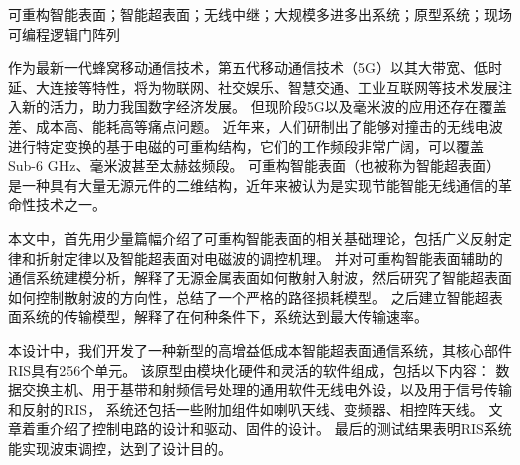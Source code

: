 \documentclass[supercite]{HustGraduPaper}
\begin{document}
\begin{cnabstract}{可重构智能表面；智能超表面；无线中继；大规模多进多出系统；原型系统；现场可编程逻辑门阵列}

	作为最新一代蜂窝移动通信技术，第五代移动通信技术（5G）以其大带宽、低时延、大连接等特性，将为物联网、社交娱乐、智慧交通、工业互联网等技术发展注入新的活力，助力我国数字经济发展。
	但现阶段5G以及毫米波的应用还存在覆盖差、成本高、能耗高等痛点问题。
	近年来，人们研制出了能够对撞击的无线电波进行特定变换的基于电磁的可重构结构，它们的工作频段非常广阔，可以覆盖Sub­-6 GHz、毫米波甚至太赫兹频段。
	可重构智能表面（也被称为智能超表面）是一种具有大量无源元件的二维结构，近年来被认为是实现节能智能无线通信的革命性技术之一。

	本文中，首先用少量篇幅介绍了可重构智能表面的相关基础理论，包括广义反射定律和折射定律以及智能超表面对电磁波的调控机理。
	并对可重构智能表面辅助的通信系统建模分析，解释了无源金属表面如何散射入射波，然后研究了智能超表面如何控制散射波的方向性，总结了一个严格的路径损耗模型。
	之后建立智能超表面系统的传输模型，解释了在何种条件下，系统达到最大传输速率。
	
	本设计中，我们开发了一种新型的高增益低成本智能超表面通信系统，其核心部件RIS具有256个单元。
	该原型由模块化硬件和灵活的软件组成，包括以下内容：
	数据交换主机、用于基带和射频信号处理的通用软件无线电外设，以及用于信号传输和反射的RIS，
	系统还包括一些附加组件如喇叭天线、变频器、相控阵天线。
	文章着重介绍了控制电路的设计和驱动、固件的设计。
	最后的测试结果表明RIS系统能实现波束调控，达到了设计目的。

\end{cnabstract}
\end{document}
